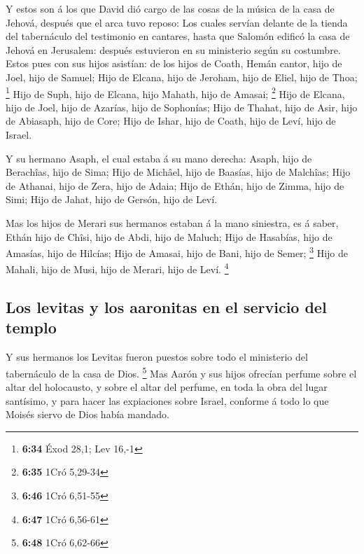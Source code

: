  Y estos son á los que David dió cargo de las cosas de la
música de la casa de Jehová, después que el arca tuvo reposo:
 Los cuales servían delante de la tienda del tabernáculo
del testimonio en cantares, hasta que Salomón edificó la casa de Jehová
en Jerusalem: después estuvieron en su ministerio según su costumbre.
 Estos pues con sus hijos asistían: de los hijos de Coath,
Hemán cantor, hijo de Joel, hijo de Samuel;  Hijo de
Elcana, hijo de Jeroham, hijo de Eliel, hijo de Thoa; \footnote{\textbf{6:34}
  Éxod 28,1; Lev 16,-1}  Hijo de Suph, hijo de Elcana, hijo
Mahath, hijo de Amasai; \footnote{\textbf{6:35} 1Cró 5,29-34}
 Hijo de Elcana, hijo de Joel, hijo de Azarías, hijo de
Sophonías;  Hijo de Thahat, hijo de Asir, hijo de Abiasaph,
hijo de Core;  Hijo de Ishar, hijo de Coath, hijo de Leví,
hijo de Israel.

 Y su hermano Asaph, el cual estaba á su mano derecha:
Asaph, hijo de Berachîas, hijo de Sima;  Hijo de Michâel,
hijo de Baasías, hijo de Malchîas;  Hijo de Athanai, hijo
de Zera, hijo de Adaia;  Hijo de Ethán, hijo de Zimma, hijo
de Simi;  Hijo de Jahat, hijo de Gersón, hijo de Leví.

 Mas los hijos de Merari sus hermanos estaban á la mano
siniestra, es á saber, Ethán hijo de Chîsi, hijo de Abdi, hijo de
Maluch;  Hijo de Hasabías, hijo de Amasías, hijo de
Hilcías;  Hijo de Amasai, hijo de Bani, hijo de Semer;
\footnote{\textbf{6:46} 1Cró 6,51-55}  Hijo de Mahali, hijo
de Musi, hijo de Merari, hijo de Leví. \footnote{\textbf{6:47} 1Cró
  6,56-61}

\hypertarget{los-levitas-y-los-aaronitas-en-el-servicio-del-templo}{%
\subsection{Los levitas y los aaronitas en el servicio del
templo}\label{los-levitas-y-los-aaronitas-en-el-servicio-del-templo}}

 Y sus hermanos los Levitas fueron puestos sobre todo el
ministerio del tabernáculo de la casa de Dios. \footnote{\textbf{6:48}
  1Cró 6,62-66}  Mas Aarón y sus hijos ofrecían perfume
sobre el altar del holocausto, y sobre el altar del perfume, en toda la
obra del lugar santísimo, y para hacer las expiaciones sobre Israel,
conforme á todo lo que Moisés siervo de Dios había mandado.

